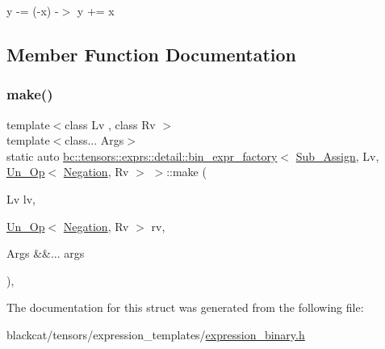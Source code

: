 y -\/= (-\/x) -\/$>$ y += x 

\subsection{Member Function Documentation}
\mbox{\label{structbc_1_1tensors_1_1exprs_1_1detail_1_1bin__expr__factory_3_01Sub__Assign_00_01Lv_00_01Un__Op_3_01Negation_00_01Rv_01_4_01_4_a382f87237b09eaf4701c09bcafa3633e}} 
\subsubsection{\texorpdfstring{make()}{make()}}
{\footnotesize\ttfamily template$<$class Lv , class Rv $>$ \\
template$<$class... Args$>$ \\
static auto \hyperlink{structbc_1_1tensors_1_1exprs_1_1detail_1_1bin__expr__factory}{bc\+::tensors\+::exprs\+::detail\+::bin\+\_\+expr\+\_\+factory}$<$ \hyperlink{structbc_1_1oper_1_1Sub__Assign}{Sub\+\_\+\+Assign}, Lv, \hyperlink{structbc_1_1tensors_1_1exprs_1_1Un__Op}{Un\+\_\+\+Op}$<$ \hyperlink{structbc_1_1oper_1_1Negation}{Negation}, Rv $>$ $>$\+::make (\begin{DoxyParamCaption}\item[{Lv}]{lv,  }\item[{\hyperlink{structbc_1_1tensors_1_1exprs_1_1Un__Op}{Un\+\_\+\+Op}$<$ \hyperlink{structbc_1_1oper_1_1Negation}{Negation}, Rv $>$}]{rv,  }\item[{Args \&\&...}]{args }\end{DoxyParamCaption})\hspace{0.3cm}{\ttfamily [inline]}, {\ttfamily [static]}}



The documentation for this struct was generated from the following file\+:\begin{DoxyCompactItemize}
\item 
blackcat/tensors/expression\+\_\+templates/\hyperlink{expression__binary_8h}{expression\+\_\+binary.\+h}\end{DoxyCompactItemize}

